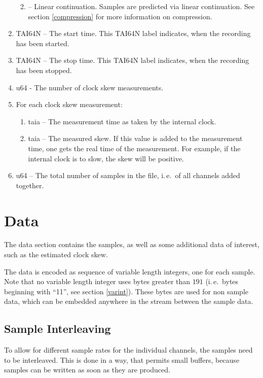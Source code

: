 \documentclass[DIV=10]{scrartcl}
\renewenvironment{quote}
{\list{}{
  \setlength{\rightmargin}{0cm}
  \setlength{\leftmargin}{0.75cm}}%
\item\relax\ignorespaces}
{\unskip\unskip\endlist}
\begin{document}
\begin{enumerate}
\begin{enumerate}
\begin{quote}
      2 – Linear continuation. Samples are predicted via linear continuation.
    \end{quote}
    See section \ref{compression} for more information on compression.
  \end{enumerate}
  \item TAI64N – The start time.
  This TAI64N label indicates, when the recording has been started.
  \item TAI64N – The stop time.
  This TAI64N label indicates, when the recording has been stopped.
  \item u64 - The number of clock skew measurements.
  \item For each clock skew measurement:
  \begin{enumerate}
    \item taia – The measurement time as taken by the internal clock.
    \item taia – The measured skew.
    If this value is added to the measurement time, one gets the real time of the measurement.
    For example, if the internal clock is to slow, the skew will be positive.
  \end{enumerate}
  \item u64 – The total number of samples in the file, i.\,e.\ of all channels added together.
\end{enumerate}

\section{Data}

The data section contains the samples, as well as some additional data of interest, such as the estimated clock skew.

The data is encoded as sequence of variable length integers, one for each sample.
Note that no variable length integer uses bytes greater than \(191\) (i.\,e.\ bytes beginning with “11”, see section \ref{varint}).
These bytes are used for non sample data, which can be embedded anywhere in the stream between the sample data.

\subsection{Sample Interleaving}

To allow for different sample rates for the individual channels, the samples need to be interleaved.
This is done in a way, that permits small buffers, because samples can be written as soon as they are produced.
\end{document}
